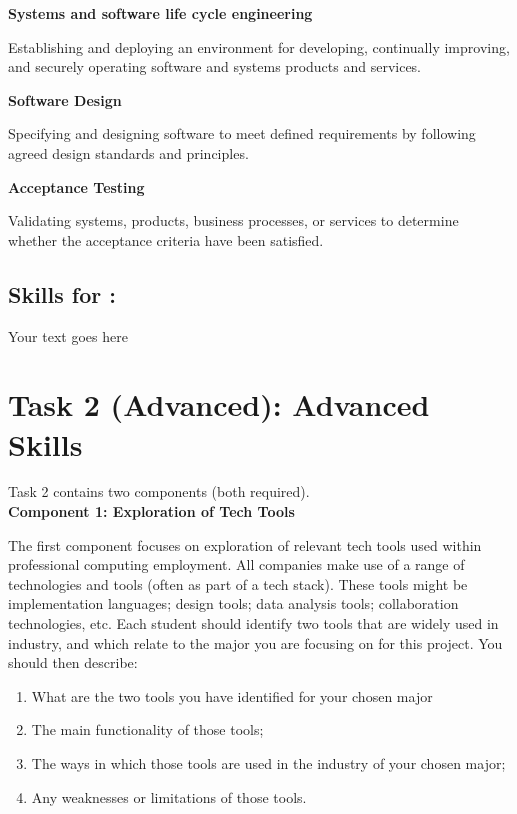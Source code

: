 \documentclass[a4paper, 11pt]{report}
\begin{document}
{\textbf{Systems and software life cycle engineering} 

Establishing and deploying an environment for developing, continually improving, and securely operating software and systems products and services.

{\textbf{Software Design}

Specifying and designing software to meet defined requirements by following agreed design standards and principles.

\textbf{Acceptance Testing}

Validating systems, products, business processes, or services to determine whether the acceptance criteria have been satisfied.

\subsection{Skills for \majD: \studD}

Your text goes here



\newpage
\section{Task 2 (Advanced): Advanced Skills}

Task 2 contains two components (both required).\\[2mm]

\textbf{Component 1: Exploration of Tech Tools}

The first component focuses on exploration of relevant tech tools used within professional computing employment. All companies make use of a range of technologies and tools (often as part of a tech stack). These tools might be implementation languages; design tools; data analysis tools; collaboration technologies, etc. Each student should identify two tools that are widely used in industry, and which relate to the major you are focusing on for this project. You should then describe:

\begin{enumerate}
\item What are the two tools you have identified for your chosen major
\item The main functionality of those tools;
\item The ways in which those tools are used in the industry of your chosen major;
\item Any weaknesses or limitations of those tools.
\end{enumerate}

}}
\end{document}
